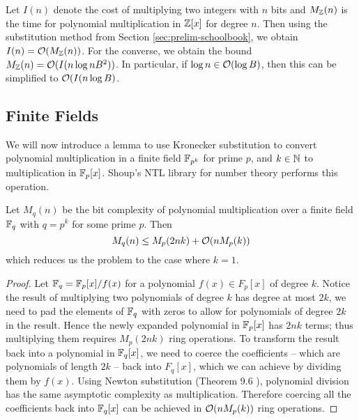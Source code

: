 Let $I(n)$ denote the cost of multiplying two integers with $n$ bits and $M_{\mathbb Z}(n)$ is the time for polynomial multiplication in ${\mathbb Z}[x]$ for degree $n$. Then using the substitution method from Section \ref{sec:prelim-schoolbook}, we obtain $I(n) = \mathcal O(M_{\mathbb Z}(n))$. For the converse, we obtain the bound $M_{\mathbb Z}(n) = \mathcal O(I(n\log nB^2))$. In particular, if $\log n \in \mathcal O(\log B)$, then this can be simplified to $\mathcal O(I(n \log B)$. 

\subsection{Finite Fields}%
\label{sub:finite-field}

We will now introduce a lemma to use Kronecker substitution to convert polynomial multiplication in a finite field ${\mathbb F}_{p^k}$ for prime $p$, and $k\in {\mathbb N}$ to multiplication in ${\mathbb F}_p [x]$. Shoup's NTL library for number theory \cite{ntl} performs this operation.

\begin{lemma}
    Let $M_q(n)$ be the bit complexity of polynomial multiplication over a finite field ${\mathbb F}_q$ with $q = p^k$ for some prime $p$. Then
    \[
        M_q(n) \leq M_p(2nk) + \mathcal O(n M_p(k))
    \]
    which reduces us the problem to the case where $k = 1$.
\end{lemma}

\begin{proof}
    Let ${\mathbb F}_q = {\mathbb F}_p[x] / f(x)$ for a polynomial $f(x) \in F_p[x]$ of degree $k$. Notice the result of multiplying two polynomials of degree $k$ has degree at most $2k$, we need to pad the elements of ${\mathbb F}_q$ with zeros to allow for polynomials of degree $2k$ in the result. Hence the newly expanded polynomial in ${\mathbb F}_p[x]$ has $2nk$ terms; thus multiplying them requires $M_p(2nk)$ ring operations. To transform the result back into a polynomial in ${\mathbb F}_q[x]$, we need to coerce the coefficients -- which are polynomials of length $2k$ -- back into $F_q[x]$, which we can achieve by dividing them by $f(x)$. Using Newton substitution (Theorem 9.6 \cite{modern-comp-alg}), polynomial division has the same asymptotic complexity as multiplication. Therefore coercing all the coefficients back into ${\mathbb F}_q[x]$ can be achieved in $\mathcal O(n M_p(k))$ ring operations.
\end{proof}

